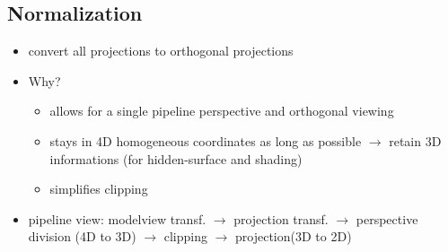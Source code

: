 \documentclass[11pt,a4paper]{article}
\begin{document}
\subsection{Normalization}
\begin{itemize}
	\item convert all projections to orthogonal projections
	\item Why?
	\begin{itemize}
		\item allows for a single pipeline perspective and orthogonal viewing
		\item stays in 4D homogeneous coordinates as long as possible $\rightarrow$ retain 3D informations (for hidden-surface and shading)
		\item simplifies clipping
	\end{itemize}
	\item pipeline view: modelview transf. $\rightarrow$ projection transf.  $\rightarrow$  perspective division (4D to 3D) $\rightarrow$  clipping  $\rightarrow$ projection(3D to 2D)
\end{itemize}
\end{document}
